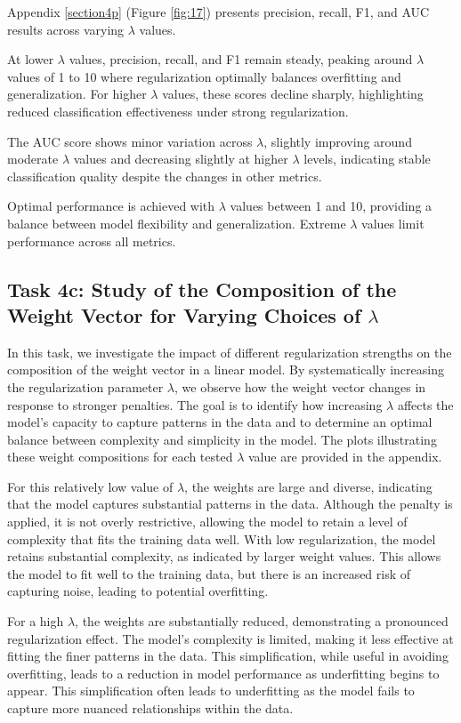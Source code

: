 \documentclass[a4paper,oneside,bibliography=totoc]{scrartcl}
\begin{document}
Appendix \ref{section4p} (Figure \ref{fig:17}) presents precision, recall, F1, and AUC results across varying $\lambda$ values. 

At lower $\lambda$ values, precision, recall, and F1 remain steady, peaking around $\lambda$ values of 1 to 10 where regularization optimally balances overfitting and generalization. For higher $\lambda$ values, these scores decline sharply, highlighting reduced classification effectiveness under strong regularization.

The AUC score shows minor variation across $\lambda$, slightly improving around moderate $\lambda$ values and decreasing slightly at higher $\lambda$ levels, indicating stable classification quality despite the changes in other metrics.

Optimal performance is achieved with $\lambda$ values between 1 and 10, providing a balance between model flexibility and generalization. Extreme $\lambda$ values limit performance across all metrics.

\subsection{Task 4c: Study of the Composition of the Weight Vector for Varying Choices of $\lambda$}

In this task, we investigate the impact of different regularization strengths on the composition of the weight vector in a linear model. By systematically increasing the regularization parameter $\lambda$, we observe how the weight vector changes in response to stronger penalties. The goal is to identify how increasing $\lambda$ affects the model's capacity to capture patterns in the data and to determine an optimal balance between complexity and simplicity in the model. The plots illustrating these weight compositions for each tested $\lambda$ value are provided in the appendix.

For this relatively low value of $\lambda$, the weights are large and diverse, indicating that the model captures substantial patterns in the data. Although the penalty is applied, it is not overly restrictive, allowing the model to retain a level of complexity that fits the training data well. With low regularization, the model retains substantial complexity, as indicated by larger weight values. This allows the model to fit well to the training data, but there is an increased risk of capturing noise, leading to potential overfitting.

For a high $\lambda$, the weights are substantially reduced, demonstrating a pronounced regularization effect. The model’s complexity is limited, making it less effective at fitting the finer patterns in the data. This simplification, while useful in avoiding overfitting, leads to a reduction in model performance as underfitting begins to appear. This simplification often leads to underfitting as the model fails to capture more nuanced relationships within the data.
\end{document}
